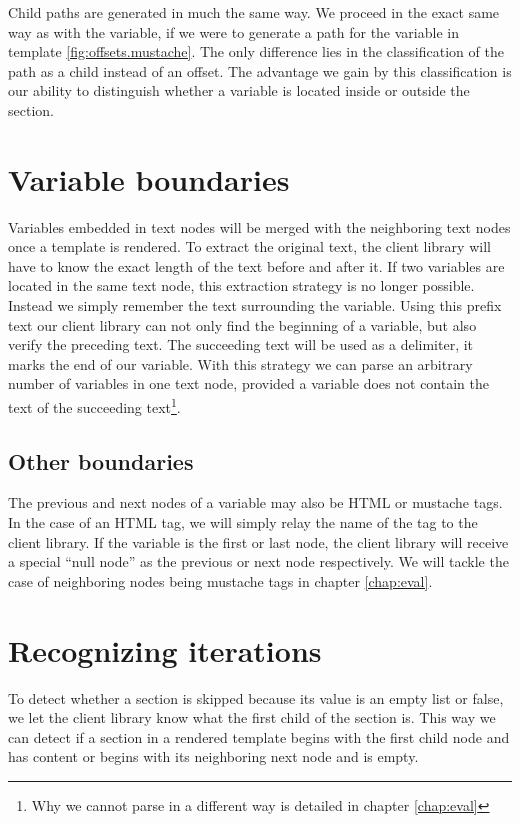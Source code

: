 \documentclass[thesis.tex]{subfiles}
\begin{document}
Child paths are generated in much the same way. We proceed in the exact same way
as with the  variable, if we were to generate a path
for the  variable in template \ref{fig:offsets.mustache}.
The only difference lies in the classification of the path as a child instead of
an offset.
The advantage we gain by this classification is our ability to distinguish
whether a variable is located inside or outside the section.

\section{Variable boundaries}
Variables embedded in text nodes will be merged with the neighboring text nodes
once a template is rendered. To extract the original text, the client library
will have to know the exact length of the text before and after it. If two
variables are located in the same text node, this extraction strategy is no
longer possible. Instead we simply remember the text surrounding the variable.
Using this prefix text our client library can not only find the beginning of a
variable, but also verify the preceding text. The succeeding text will be
used as a delimiter, it marks the end of our variable.
With this strategy we can parse an arbitrary number of variables in one text
node, provided a variable does not contain the text of the succeeding
text\footnote{Why we cannot parse in a different way is detailed in chapter
\ref{chap:eval}}.

\subsection{Other boundaries}
The previous and next nodes of a variable may also be HTML or mustache tags.
In the case of an HTML tag, we will simply relay the name of the tag to the
client library. If the variable is the first or last node, the client library
will receive a special ``null node'' as the previous or next node respectively.
We will tackle the case of neighboring nodes being mustache tags in chapter
\ref{chap:eval}.

\section{Recognizing iterations}
To detect whether a section is skipped because its value is an empty
list or false, we let the client library know what the first child of the
section is.
This way we can detect if a section in a rendered template begins with the
first child node and has content or begins with its neighboring next node and is
empty.
\end{document}
